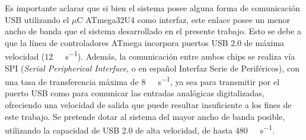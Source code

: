 Es importante aclarar que si bien el sistema posee alguna forma de comunicación USB utilizando el $\mu$C ATmega32U4 como interfaz, este enlace posee un menor ancho de banda que el sistema desarrollado en el presente trabajo. Esto se debe a que la línea de controladores ATmega incorpora puertos USB 2.0 de máxima velocidad (\SI{12}{\mega\bit\per\second})\cite{Atmel2016}. Además, la comunicación entre ambos chips se realiza vía SPI (\textit{Serial Peripherical Interface}, o en español Interfaz Serie de Periféricos), con una tasa de transferencia máxima de \SI{8}{\mega\bit\per\second}\cite{Atmel2016}, ya sea para transmitir por el puerto USB como para comunicar las entradas analógicas digitalizadas, ofreciendo una velocidad de salida que puede resultar insuficiente a los fines de este trabajo. Se pretende dotar al sistema del mayor ancho de banda posible, utilizando la capacidad de USB 2.0 de alta velocidad, de hasta \SI{480}{\mega\bit\per\second}.